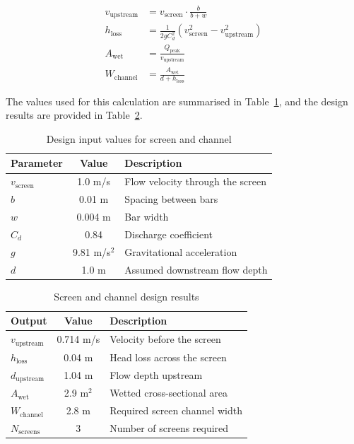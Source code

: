 \documentclass[12pt]{article}
\begin{document}
\begin{align}
v_{\text{upstream}} &= v_{\text{screen}} \cdot \frac{b}{b + w} \label{eq:screen_velocity} \\
h_{\text{loss}} &= \frac{1}{2g C_d^2} \left( v_{\text{screen}}^2 - v_{\text{upstream}}^2 \right) \label{eq:screen_headloss} \\
A_{\text{wet}} &= \frac{Q_{\text{peak}}}{v_{\text{upstream}}} \label{eq:screen_area} \\
W_{\text{channel}} &= \frac{A_{\text{wet}}}{d + h_{\text{loss}}} \label{eq:screen_width}
\end{align}

The values used for this calculation are summarised in Table~\ref{tab:screen_inputs}, 
and the design results are provided in Table~\ref{tab:screen_outputs}.

\begin{table}[h]
\centering
\caption{Design input values for screen and channel}
\label{tab:screen_inputs}
\begin{tabular}{|l|c|l|}
\hline
\textbf{Parameter} & \textbf{Value} & \textbf{Description} \\
\hline
$v_{\text{screen}}$ & 1.0 m/s & Flow velocity through the screen \\
$b$ & 0.01 m & Spacing between bars \\
$w$ & 0.004 m & Bar width \\
$C_d$ & 0.84 & Discharge coefficient \\
$g$ & 9.81 m/s$^2$ & Gravitational acceleration \\
$d$ & 1.0 m & Assumed downstream flow depth \\
\hline
\end{tabular}
\end{table}

\begin{table}[h]
\centering
\caption{Screen and channel design results}
\label{tab:screen_outputs}
\begin{tabular}{|l|c|l|}
\hline
\textbf{Output} & \textbf{Value} & \textbf{Description} \\
\hline
$v_{\text{upstream}}$ & 
0.714
 m/s
& Velocity before the screen \\
$h_{\text{loss}}$ & 
0.04
 m
& Head loss across the screen \\
$d_{\text{upstream}}$ & 
1.04
m & Flow depth upstream \\
$A_{\text{wet}}$ & 
2.9
m$^2$ & Wetted cross-sectional area \\
$W_{\text{channel}}$ & 
2.8
m & Required screen channel width \\
$N_{\text{screens}}$ & 
3
& Number of screens required \\
\hline
\end{tabular}
\end{table}
\end{document}
